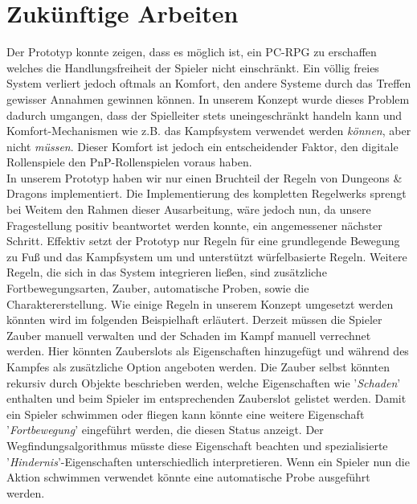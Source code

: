 \section{Zukünftige Arbeiten}
\label{sec:futurework}

Der Prototyp konnte zeigen, dass es möglich ist, ein PC-RPG zu erschaffen welches die Handlungsfreiheit der Spieler nicht einschränkt. Ein völlig freies System verliert jedoch oftmals an Komfort, den andere Systeme durch das Treffen gewisser Annahmen gewinnen können. In unserem Konzept wurde dieses Problem dadurch umgangen, dass der Spielleiter stets uneingeschränkt handeln kann und Komfort-Mechanismen wie z.B. das Kampfsystem verwendet werden \emph{können}, aber nicht \emph{müssen}. Dieser Komfort ist jedoch ein entscheidender Faktor, den digitale Rollenspiele den PnP-Rollenspielen voraus haben.\\
In unserem Prototyp haben wir nur einen Bruchteil der Regeln von Dungeons \& Dragons implementiert. Die Implementierung des kompletten Regelwerks sprengt bei Weitem den Rahmen dieser Ausarbeitung, wäre jedoch nun, da unsere Fragestellung positiv beantwortet werden konnte, ein angemessener nächster Schritt.\newline
Effektiv setzt der Prototyp nur Regeln für eine grundlegende Bewegung zu Fuß und das Kampfsystem um und unterstützt würfelbasierte Regeln. Weitere Regeln, die sich in das System integrieren ließen, sind zusätzliche Fortbewegungsarten, Zauber, automatische Proben, sowie die Charaktererstellung. Wie einige Regeln in unserem Konzept umgesetzt werden könnten wird im folgenden Beispielhaft erläutert.\newline
Derzeit müssen die Spieler Zauber manuell verwalten und der Schaden im Kampf manuell verrechnet werden. Hier könnten Zauberslots als Eigenschaften hinzugefügt und während des Kampfes als zusätzliche Option angeboten werden. Die Zauber selbst könnten rekursiv durch Objekte beschrieben werden, welche Eigenschaften wie '\textit{Schaden}' enthalten und beim Spieler im entsprechenden Zauberslot gelistet werden.\newline
Damit ein Spieler schwimmen oder fliegen kann könnte eine weitere Eigenschaft '\textit{Fortbewegung}' eingeführt werden, die diesen Status anzeigt. Der Wegfindungsalgorithmus müsste diese Eigenschaft beachten und spezialisierte '\textit{Hindernis}'-Eigenschaften unterschiedlich interpretieren. Wenn ein Spieler nun die Aktion schwimmen verwendet könnte eine automatische Probe ausgeführt werden.\newline
